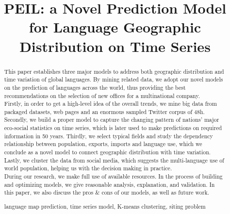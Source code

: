 \documentclass{mcmthesis}
\title {PEIL: a Novel Prediction Model for Language Geographic Distribution on Time Series}
\date{}
\begin{document}
  \begin{abstract}
  
    \indent This paper establishes three major models to address both geographic distribution and time variation of global languages. By mining related data, we adopt our novel models on the prediction of languages across the world, thus providing the best recommendations on the selection of new offices for a multinational company.\\
    \indent Firstly, in order to get a high-level idea of the overall trends, we mine big data from packaged datasets, web pages and an enormous sampled Twitter corpus of 48h. Secondly, we build a proper model to capture the changing pattern of nations' major eco-social statistics on time series, which is later used to make predictions on required information in 50 years. Thirdly, we select typical fields and study the dependency relationship between population, exports, imports and language use, which we conclude as a novel model to connect geographic distribution with time variation. Lastly, we cluster the data from social media, which suggests the multi-language use of world population, helping us with the decision making in practice.\\
    \indent During our research, we make full use of available resources. In the process of building and optimizing models, we give reasonable analysis, explanation, and validation. In this paper, we also discuss the pros \& cons of our models, as well as future work.\\
    
  \begin{keywords}
    language map prediction, time series model, K-means clustering, siting problem
  \end{keywords}
  \end{abstract}
  \maketitle
  \pagestyle{empty}
  \newpage
  \tableofcontents
  \setmainfont{Times New Roman}
  \newpage
  \pagestyle{fancy}
  \setcounter{page}{1}
\end{document}
